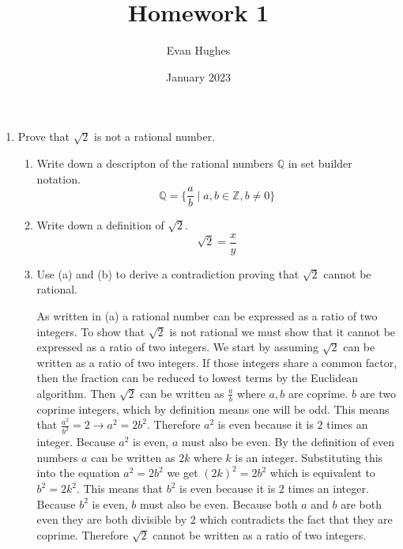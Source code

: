 \documentclass{article}
\title{Homework 1}
\author{Evan Hughes}
\date{January 2023}
\begin{document}
\maketitle
\begin{enumerate}

    \item Prove that $\sqrt{2}$ is not a rational number.
    
    \begin{enumerate}
        \item Write down a descripton of the rational numbers $\mathbb{Q}$ in set builder notation.
        \begin{equation}
        \mathbb{Q} = \{ \frac{a}{b} \mid a,b \in \mathbb{Z}, b \neq 0 \}
        \end{equation}
        \item Write down a definition of $\sqrt{2}$.
        \begin{equation}
        \sqrt{2} = \frac{x}{y}
        \end{equation}
        \item Use (a) and (b) to derive a contradiction proving that $\sqrt{2}$ cannot be rational.
        
        As written in (a) a rational number can be expressed as a ratio of two integers. To show that $\sqrt{2}$ is not
        rational we must show that it cannot be expressed as a ratio of two integers.
        We start by assuming $\sqrt{2}$ can be written as a ratio of two integers.
        If those integers share a common factor, then the fraction can be reduced to lowest terms by the Euclidean algorithm.
        Then $\sqrt{2}$ can be written as $\frac{a}{b}$ where $a,b$ are coprime. 
        $b$ are two coprime integers, which by definition means one will be odd.
        This means that $\frac{a^2}{b^2}=2 \rightarrow a^2=2b^2$. Therefore $a^2$ is even because it is $2$ times an integer.
        Because $a^2$ is even, $a$ must also be even. By the definition of even numbers $a$ can be written as 
        $2k$ where $k$ is an integer. Substituting this into the equation $a^2=2b^2$ we get ${( 2k) }^2=2b^2$ which is equivalent to $b^2 = 2k^2$.
        This means that $b^2$ is even because it is $2$ times an integer. Because $b^2$ is even, $b$ must also be even.
        Because both $a$ and $b$ are both even they are both divisible by $2$ which contradicts the fact that they are coprime.
        Therefore $\sqrt{2}$ cannot be written as a ratio of two integers.


\end{enumerate}
\end{enumerate}
\end{document}
